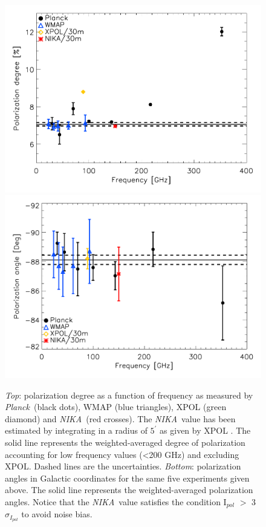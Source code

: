 \documentclass[twocolumn,traditabstract]{aa}
\def\NIKA{\textit{NIKA}}
\def\Planck{\textit{Planck}}
\begin{document}
\begin{figure}
  \centering
          { \includegraphics[width=1\linewidth,keepaspectratio]{figures/pdegree_comparison.pdf}}
          { \includegraphics[width=1\linewidth,keepaspectratio]{figures/angle_comparison.pdf}} 
            \caption{{\it Top}: polarization degree as a function of frequency as measured by \Planck\ (black dots), WMAP (blue triangles), XPOL (green diamond) and \NIKA\ (red crosses). The \NIKA\ value has been estimated by integrating in a radius of $5^{\prime}$ as given by XPOL \citep{aumont2010}. The solid line represents the weighted-averaged degree of polarization accounting for low frequency values (\textless 200 GHz) and excluding XPOL.
            Dashed lines are the uncertainties.
            {\it Bottom}: polarization angles in Galactic coordinates for the same five experiments given above. The solid line represents the weighted-averaged polarization angles. Notice that the \NIKA\ value satisfies the condition I$_{pol}$ $>$ 3$\sigma_{I_{pol}}$ to avoid noise bias.} %
\label{crab_p_angle_comparison}		
  \end{figure}
\end{document}
